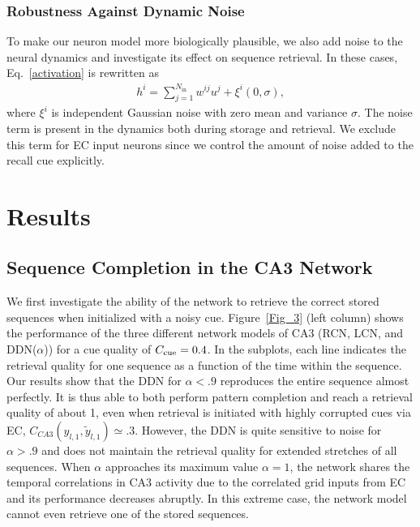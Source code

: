 \documentclass[utf8]{frontiersSCNS} %
\begin{document}
\subsubsection{Robustness Against Dynamic Noise}

To make our neuron model more biologically plausible, we also add noise to the neural dynamics and investigate its effect on sequence retrieval. In these cases, Eq.~\ref{activation} is rewritten as
\begin{align}
\label{dynamic-noise}
h^i = \sum_{j=1}^{N_\mathrm{in}} w^{ij}u^j + \xi ^i (0,\sigma),
\end{align}  
where $\xi^i$ is independent Gaussian noise with zero mean and variance $\sigma$. The noise term is present in the dynamics both during storage and retrieval. We exclude this term for EC input neurons since we control the amount of noise added to the recall cue explicitly.


\section{Results}
\subsection{Sequence Completion in the CA3 Network}

We first investigate the ability of the network to retrieve the correct stored sequences when initialized with a noisy cue. Figure~\ref{Fig_3} (left column) shows the performance of the three different network models of CA3 (RCN, LCN, and DDN($\alpha$)) for a cue quality of $C_{\rm cue} = 0.4$. In the subplots, each line indicates the retrieval quality for one sequence as a function of the time within the sequence.
Our results show that the DDN for $\alpha < .9$ reproduces the entire sequence almost perfectly. It is thus able to both perform pattern completion and reach a retrieval quality of about 1, even when retrieval is initiated with highly corrupted cues via EC, $C_{CA3} (y_{l,1}, \tilde{y}_{l,1}) \simeq .3 $. 
However, the DDN is quite sensitive to noise for $\alpha > .9$ and does not maintain the retrieval quality for extended stretches of all sequences. When $\alpha$ approaches its maximum value $\alpha = 1$, the network shares the temporal correlations in CA3 activity due to the correlated grid inputs from EC and its performance decreases abruptly. In this extreme case, the network model cannot even retrieve one of the stored sequences.
% 
\end{document}
